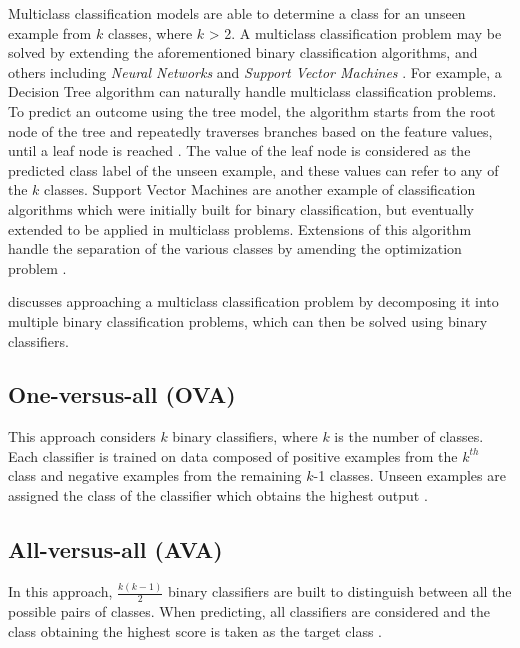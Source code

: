 Multiclass classification models are able to determine a class for an unseen example from $k$ classes, where $k$ > 2. A multiclass classification problem may be solved by extending the aforementioned binary classification algorithms, and others including \textit{Neural Networks} and \textit{Support Vector Machines} \citep{aly2005}. For example, a Decision Tree algorithm can naturally handle multiclass classification problems. To predict an outcome using the tree model, the algorithm starts from the root node of the tree and repeatedly traverses branches based on the feature values, until a leaf node is reached \citep{rokach2007}. The value of the leaf node is considered as the predicted class label of the unseen example, and these values can refer to any of the $k$ classes. Support Vector Machines are another example of classification algorithms which were initially built for binary classification, but eventually extended to be applied in multiclass problems. Extensions of this algorithm handle the separation of the various classes by amending the optimization problem \citep{aly2005}.   

\citet{aly2005} discusses approaching a multiclass classification problem by decomposing it into multiple binary classification problems, which can then be solved using binary classifiers.

\subsection{One-versus-all (OVA)} 
This approach considers $k$ binary classifiers, where $k$ is the number of classes. Each classifier is trained on data composed of positive examples from the $k^{th}$ class and negative examples from the remaining $k$-1 classes. Unseen examples are assigned the class of the classifier which obtains the highest output \citep{aly2005}.

\subsection{All-versus-all (AVA)} 

In this approach, $\frac{k(k-1)}{2}$ binary classifiers are built to distinguish between all the possible pairs of classes. When predicting, all classifiers are considered and the class obtaining the highest score is taken as the target class \citep{aly2005}.


